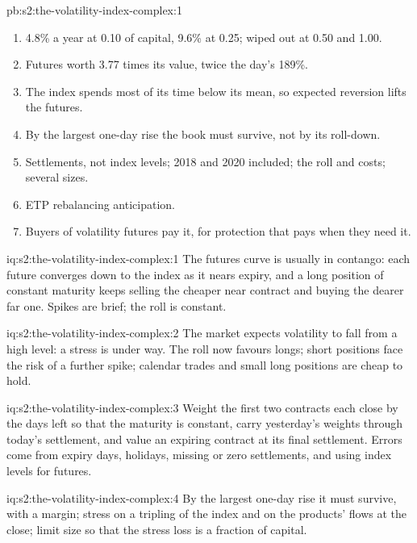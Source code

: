\begin{solution}{pb:s2:the-volatility-index-complex:1}
\begin{enumerate}
value and ended at zero when the first crash took the index from 17.3 to 63.6, facing a flow of 3.77 times its value at that close.
\item 4.8\% a year at 0.10 of capital, 9.6\% at 0.25; wiped out at 0.50 and 1.00.
\item Futures worth 3.77 times its value, twice the day's 189\%.
\item The index spends most of its time below its mean, so expected reversion lifts the futures.
\item By the largest one-day rise the book must survive, not by its roll-down.
\item Settlements, not index levels; 2018 and 2020 included; the roll and costs; several sizes.
\item ETP rebalancing anticipation.
\item Buyers of volatility futures pay it, for protection that pays when they need it.
\end{enumerate}
\end{solution}

\begin{solution}{iq:s2:the-volatility-index-complex:1}
The futures curve is usually in contango: each future converges down to the index as it nears expiry, and a long position of constant maturity keeps
selling the cheaper near contract and buying the dearer far one. Spikes are brief; the roll is constant.
\end{solution}

\begin{solution}{iq:s2:the-volatility-index-complex:2}
The market expects volatility to fall from a high level: a stress is under way. The roll now favours longs; short positions face the risk of a further
spike; calendar trades and small long positions are cheap to hold.
\end{solution}

\begin{solution}{iq:s2:the-volatility-index-complex:3}
Weight the first two contracts each close by the days left so that the maturity is constant, carry yesterday's weights through today's settlement, and
value an expiring contract at its final settlement. Errors come from expiry days, holidays, missing or zero settlements, and using index levels for
futures.
\end{solution}

\begin{solution}{iq:s2:the-volatility-index-complex:4}
By the largest one-day rise it must survive, with a margin; stress on a tripling of the index and on the products' flows at the close; limit size
so that the stress loss is a fraction of capital.
\end{solution}

